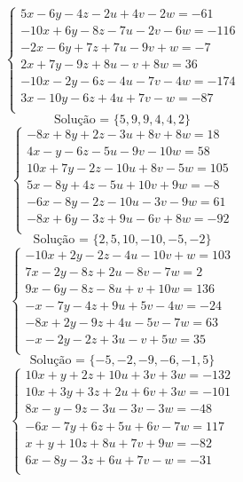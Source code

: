 \documentclass[12pt,oneside,a4paper]{article}
\begin{document}
\vspace{\baselineskip}
\begin{equation*}
\begin{cases}
5x-6y-4z-2u+4v-2w=-61 \\
-10x+6y-8z-7u-2v-6w=-116 \\
-2x-6y+7z+7u-9v+w=-7 \\
2x+7y-9z+8u-v+8w=36 \\
-10x-2y-6z-4u-7v-4w=-174 \\
3x-10y-6z+4u+7v-w=-87 \\
\end{cases}
\end{equation*}
\begin{equation*}
\text{Solução = }\{5,9,9,4,4,2\}
\end{equation*}
\vspace{\baselineskip}
\begin{equation*}
\begin{cases}
-8x+8y+2z-3u+8v+8w=18 \\
4x-y-6z-5u-9v-10w=58 \\
10x+7y-2z-10u+8v-5w=105 \\
5x-8y+4z-5u+10v+9w=-8 \\
-6x-8y-2z-10u-3v-9w=61 \\
-8x+6y-3z+9u-6v+8w=-92 \\
\end{cases}
\end{equation*}
\begin{equation*}
\text{Solução = }\{2,5,10,-10,-5,-2\}
\end{equation*}
\vspace{\baselineskip}
\begin{equation*}
\begin{cases}
-10x+2y-2z-4u-10v+w=103 \\
7x-2y-8z+2u-8v-7w=2 \\
9x-6y-8z-8u+v+10w=136 \\
-x-7y-4z+9u+5v-4w=-24 \\
-8x+2y-9z+4u-5v-7w=63 \\
-x-2y-2z+3u-v+5w=35 \\
\end{cases}
\end{equation*}
\begin{equation*}
\text{Solução = }\{-5,-2,-9,-6,-1,5\}
\end{equation*}
\vspace{\baselineskip}
\begin{equation*}
\begin{cases}
10x+y+2z+10u+3v+3w=-132 \\
10x+3y+3z+2u+6v+3w=-101 \\
8x-y-9z-3u-3v-3w=-48 \\
-6x-7y+6z+5u+6v-7w=117 \\
x+y+10z+8u+7v+9w=-82 \\
6x-8y-3z+6u+7v-w=-31 \\
\end{cases}
\end{equation*}
\end{document}
